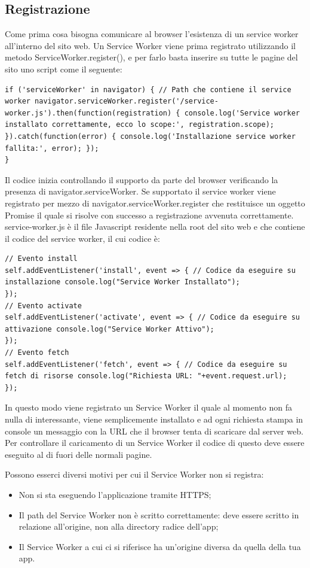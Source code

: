 \documentclass[italian]{article}
\begin{document}
\subsection{Registrazione}

Come prima cosa bisogna comunicare al browser l’esistenza di un service worker all’interno del sito web. Un Service Worker viene prima registrato utilizzando il metodo ServiceWorker.register(), e per farlo basta inserire su tutte le pagine del sito uno script come il seguente:
\begin{lstlisting}
if ('serviceWorker' in navigator) { // Path che contiene il service worker navigator.serviceWorker.register('/service-worker.js').then(function(registration) { console.log('Service worker installato correttamente, ecco lo scope:', registration.scope); }).catch(function(error) { console.log('Installazione service worker fallita:', error); });
}
\end{lstlisting}
Il codice inizia controllando il supporto da parte del browser verificando la presenza di navigator.serviceWorker. Se supportato il service worker viene registrato per mezzo di navigator.serviceWorker.register che restituisce un oggetto Promise il quale si risolve con successo a registrazione avvenuta correttamente.
service-worker.js è il file Javascript residente nella root del sito web e che contiene il codice del service worker, il cui codice è:
\begin{lstlisting}
// Evento install
self.addEventListener('install', event => { // Codice da eseguire su installazione console.log("Service Worker Installato");
});
// Evento activate
self.addEventListener('activate', event => { // Codice da eseguire su attivazione console.log("Service Worker Attivo");
});
// Evento fetch
self.addEventListener('fetch', event => { // Codice da eseguire su fetch di risorse console.log("Richiesta URL: "+event.request.url);
});
\end{lstlisting}

In questo modo viene registrato un Service Worker il quale al momento non fa nulla di interessante, viene semplicemente installato e ad ogni richiesta stampa in console un messaggio con la URL che il browser tenta di scaricare dal server web. Per controllare il caricamento di un Service Worker il codice di questo deve essere eseguito al di fuori delle normali pagine.

Possono esserci diversi motivi per cui il Service Worker non si registra:
\begin{itemize}
	\item Non si sta eseguendo l'applicazione tramite HTTPS;
	\item Il path del Service Worker non è scritto correttamente: deve essere scritto in relazione all'origine, non alla directory radice dell'app;
	\item Il Service Worker a cui ci si riferisce ha un'origine diversa da quella della tua app.
\end{itemize}
\end{document}
